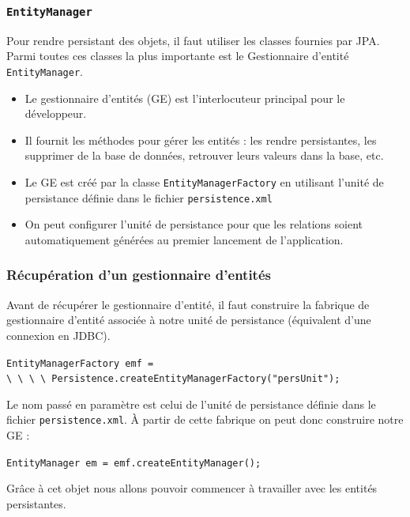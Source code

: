 \documentclass[xcolor=pdftex,x11names,table]{beamer}
\begin{document}
  \begin{frame}
    \frametitle{\texttt{EntityManager}}
    Pour rendre persistant des objets, il faut utiliser les classes fournies par JPA. Parmi toutes ces classes la plus 
    importante est le Gestionnaire d'entité \texttt{EntityManager}.
    \begin{itemize}
		  \item Le gestionnaire d’entités (GE) est l’interlocuteur principal pour le développeur.
		  \item Il fournit les méthodes pour gérer les entités : les rendre persistantes, les supprimer de la
			base de données, retrouver leurs valeurs dans la base, etc.
			\item Le GE est créé par la classe \texttt{EntityManagerFactory} en utilisant l'unité de persistance définie dans 
			le fichier \texttt{persistence.xml}
			\item On peut configurer l'unité de persistance pour que les relations soient automatiquement générées 
			au premier lancement de l'application.
		\end{itemize}
  \end{frame}

  \begin{frame}
    \frametitle{Récupération d'un gestionnaire d’entités}
    Avant de récupérer le gestionnaire d'entité, il faut construire la fabrique de gestionnaire d'entité associée à notre unité de persistance (équivalent d'une 
    connexion en JDBC).
    \begin{block}{}
    	\lstinline$EntityManagerFactory emf = $\\
    	\lstinline$\ \ \ \ Persistence.createEntityManagerFactory("persUnit");$\\
		\end{block}
		Le nom passé en paramètre est celui de l'unité de persistance définie dans le fichier \texttt{persistence.xml}.
		À partir de cette fabrique on peut donc construire notre GE :
		\begin{block}{}
    	\lstinline$EntityManager em = emf.createEntityManager();$\\
		\end{block}
		Grâce à cet objet nous allons pouvoir commencer à travailler avec les entités persistantes.
  \end{frame}
\end{document}
